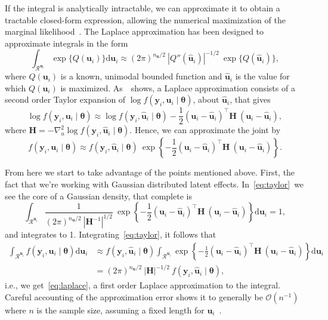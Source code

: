 If the integral is analytically intractable, we can approximate it to
obtain a tractable closed-form expression, allowing the numerical
maximization of the marginal likelihood~\cite{patrao}. The Laplace
approximation has been designed to approximate integrals in the form
\begin{equation}
  \int_{\mathcal{R}^{\mathbf{u}_{i}}}
  \exp\{Q(\mathbf{u}_{i})\} \text{d} \mathbf{u}_{i}
  \approx (2\pi)^{n_{\mathbf{u}}/2}~
  |{Q}''(\mathbf{\hat{u}}_{i})|^{-1/2}~\exp\{Q(\mathbf{\hat{u}}_{i})\},
  \label{eq:laplace}
\end{equation}
where \(Q(\mathbf{u}_{i})\) is a known, unimodal bounded function and
\(\mathbf{\hat{u}}_{i}\) is the value for which \(Q(\mathbf{u}_{i})\) is
maximized. As~~shows, a Laplace approximation
consists of a second order Taylor expansion of \(\log f(\mathbf{y}_{i},
\mathbf{u}_{i} \mid \bm{\theta})\), about \(\mathbf{\hat{u}}_{i}\), that
gives
\[
  \log f(\mathbf{y}_{i}, \mathbf{u}_{i} \mid \bm{\theta}) \approx
  \log f(\mathbf{y}_{i}, \mathbf{\hat{u}}_{i} \mid \bm{\theta}) -
  \frac{1}{2}
  (\mathbf{u}_{i} - \mathbf{\hat{u}}_{i})^{\top}\mathbf{H}~
  (\mathbf{u}_{i} - \mathbf{\hat{u}}_{i}),
\]
where \(\mathbf{H} = - \nabla_{u}^{2} \log f(\mathbf{y}_{i},
\mathbf{\hat{u}}_{i} \mid \bm{\theta})\). Hence, we can approximate the
joint by
\begin{equation}
  f(\mathbf{y}_{i}, \mathbf{u}_{i} \mid \bm{\theta}) \approx
  f(\mathbf{y}_{i}, \mathbf{\hat{u}}_{i} \mid \bm{\theta})~\exp
  \left\{- \frac{1}{2}
    (\mathbf{u}_{i} - \mathbf{\hat{u}}_{i})^{\top}\mathbf{H}~
    (\mathbf{u}_{i} - \mathbf{\hat{u}}_{i})
  \right\}.
  \label{eq:taylor}
\end{equation}

From here we start to take advantage of the points mentioned above.
First, the fact that we're working with Gaussian distributed latent
effects. In~\autoref{eq:taylor}~we see the core of a Gaussian density,
that complete is
\[
  \int_{\mathcal{R}^{\mathbf{u}_{i}}}
  \frac{1}{(2 \pi)^{n_{\mathbf{u}}/2}~|\mathbf{H}^{-1}|^{1/2}}~\exp
  \left\{- \frac{1}{2}
    (\mathbf{u}_{i} - \mathbf{\hat{u}}_{i})^{\top}\mathbf{H}~
    (\mathbf{u}_{i} - \mathbf{\hat{u}}_{i})
  \right\} \text{d} \mathbf{u}_{i} = 1,
\]
and integrates to 1. Integrating~\autoref{eq:taylor}, it follows that
\begin{align*}
  \int_{\mathcal{R}^{\mathbf{u}_{i}}}
  f(\mathbf{y}_{i}, \mathbf{u}_{i} \mid \bm{\theta})
  \text{d} \mathbf{u}_{i}
  &\approx f(\mathbf{y}_{i}, \mathbf{\hat{u}}_{i} \mid \bm{\theta})
    \int_{\mathcal{R}^{\mathbf{u}_{i}}} \exp
    \left\{- \frac{1}{2}
    (\mathbf{u}_{i} - \mathbf{\hat{u}}_{i})^{\top}\mathbf{H}~
    (\mathbf{u}_{i} - \mathbf{\hat{u}}_{i})
    \right\} \text{d} \mathbf{u}_{i}\\
  &= (2 \pi)^{n_{\mathbf{u}}/2}~|\mathbf{H}|^{-1/2}~
    f(\mathbf{y}_{i}, \mathbf{\hat{u}}_{i} \mid \bm{\theta}),
\end{align*}
i.e., we get~\autoref{eq:laplace}, a first order Laplace approximation
to the integral. Careful accounting of the approximation error shows it
to generally be \(\mathcal{O}(n^{-1})\) where \(n\) is the sample size,
assuming a fixed length for \(\mathbf{u}_{i}\)~\cite{corestats}.

